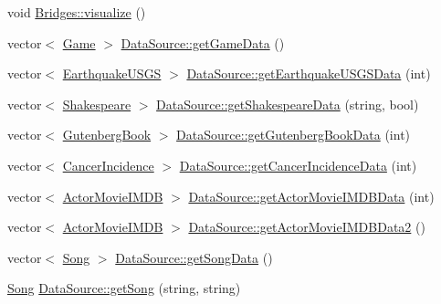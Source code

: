 \begin{DoxyCompactItemize}
\item 
void \mbox{\hyperlink{classbridges_1_1_server_comm_a0a9e3be9faab475909293766dcda4779}{Bridges\+::visualize}} ()
\item 
vector$<$ \mbox{\hyperlink{classbridges_1_1_game}{Game}} $>$ \mbox{\hyperlink{classbridges_1_1_server_comm_aaf9715981dcd976f93624bd3aa22183f}{Data\+Source\+::get\+Game\+Data}} ()
\item 
vector$<$ \mbox{\hyperlink{classbridges_1_1_earthquake_u_s_g_s}{Earthquake\+U\+S\+GS}} $>$ \mbox{\hyperlink{classbridges_1_1_server_comm_a465a9593399d31b531e61b878a8134b2}{Data\+Source\+::get\+Earthquake\+U\+S\+G\+S\+Data}} (int)
\item 
vector$<$ \mbox{\hyperlink{classbridges_1_1_shakespeare}{Shakespeare}} $>$ \mbox{\hyperlink{classbridges_1_1_server_comm_a1f240eea3d39812606c0b3d10bdc757c}{Data\+Source\+::get\+Shakespeare\+Data}} (string, bool)
\item 
vector$<$ \mbox{\hyperlink{classbridges_1_1_gutenberg_book}{Gutenberg\+Book}} $>$ \mbox{\hyperlink{classbridges_1_1_server_comm_a8daad6bf2db8bf4f0b0f9914022b6aa4}{Data\+Source\+::get\+Gutenberg\+Book\+Data}} (int)
\item 
vector$<$ \mbox{\hyperlink{classbridges_1_1_cancer_incidence}{Cancer\+Incidence}} $>$ \mbox{\hyperlink{classbridges_1_1_server_comm_a206da9499372409063d2abe5d1e9bce0}{Data\+Source\+::get\+Cancer\+Incidence\+Data}} (int)
\item 
vector$<$ \mbox{\hyperlink{classbridges_1_1_actor_movie_i_m_d_b}{Actor\+Movie\+I\+M\+DB}} $>$ \mbox{\hyperlink{classbridges_1_1_server_comm_aeea4f9e05ded118d657ac8ba9e66f22d}{Data\+Source\+::get\+Actor\+Movie\+I\+M\+D\+B\+Data}} (int)
\item 
vector$<$ \mbox{\hyperlink{classbridges_1_1_actor_movie_i_m_d_b}{Actor\+Movie\+I\+M\+DB}} $>$ \mbox{\hyperlink{classbridges_1_1_server_comm_a19c19c0812754ec276dabbf88d5cedaf}{Data\+Source\+::get\+Actor\+Movie\+I\+M\+D\+B\+Data2}} ()
\item 
vector$<$ \mbox{\hyperlink{classbridges_1_1_song}{Song}} $>$ \mbox{\hyperlink{classbridges_1_1_server_comm_ada47f365ba4e6c3ef6dbca3afdd20b3f}{Data\+Source\+::get\+Song\+Data}} ()
\item 
\mbox{\hyperlink{classbridges_1_1_song}{Song}} \mbox{\hyperlink{classbridges_1_1_server_comm_a73eb84d47c0786146b4baceb9d208ea3}{Data\+Source\+::get\+Song}} (string, string)
\end{DoxyCompactItemize}



